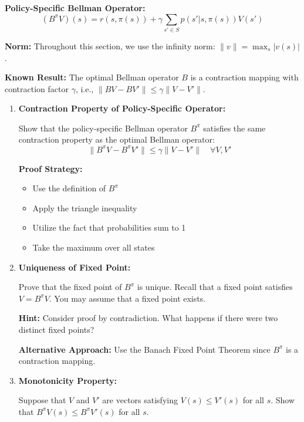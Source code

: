 \documentclass[12pt]{article}
\begin{document}
{{\textbf{Policy-Specific Bellman Operator:}
\begin{equation}
(B^{\pi}V)(s) = r(s, \pi(s)) + \gamma \sum_{s' \in S} p(s'|s, \pi(s))V(s')
\end{equation}

\textbf{Norm:} Throughout this section, we use the infinity norm: \( \|v\| = \max_s |v(s)| \).

\textbf{Known Result:} The optimal Bellman operator \( B \) is a contraction mapping with contraction factor \( \gamma \), i.e., \( \|BV - BV'\| \leq \gamma\|V - V'\| \).

\begin{enumerate}
    \item \textbf{Contraction Property of Policy-Specific Operator:}
    
    Show that the policy-specific Bellman operator \( B^{\pi} \) satisfies the same contraction property as the optimal Bellman operator:
    \[
    \|B^{\pi}V - B^{\pi}V'\| \leq \gamma \|V - V'\| \quad \forall V, V'
    \]
    
    \textbf{Proof Strategy:}
    \begin{itemize}
        \item Use the definition of \( B^{\pi} \)
        \item Apply the triangle inequality
        \item Utilize the fact that probabilities sum to 1
        \item Take the maximum over all states
    \end{itemize}
    
    \item \textbf{Uniqueness of Fixed Point:}
    
    Prove that the fixed point of \( B^{\pi} \) is unique. Recall that a fixed point satisfies \( V = B^{\pi}V \). You may assume that a fixed point exists.
    
    \textbf{Hint:} Consider proof by contradiction. What happens if there were two distinct fixed points?
    
    \textbf{Alternative Approach:} Use the Banach Fixed Point Theorem since \( B^{\pi} \) is a contraction mapping.

    \item \textbf{Monotonicity Property:}
    
    Suppose that \( V \) and \( V' \) are vectors satisfying \( V(s) \leq V'(s) \) for all \( s \). Show that \( B^{\pi}V(s) \leq B^{\pi}V'(s) \) for all \( s \).
    

\end{enumerate}}}
\end{document}
